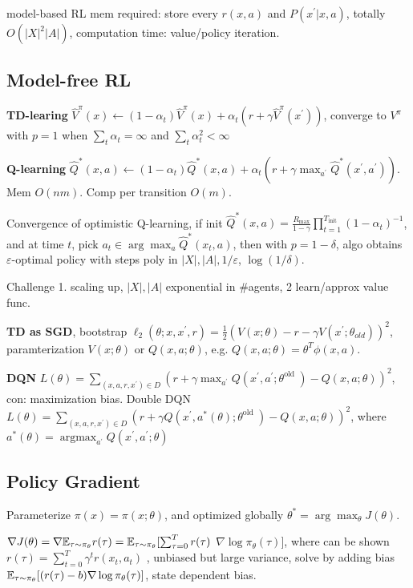 model-based RL mem required: store every $r(x, a)$ and $P(x^{\prime} | x, a)$, totally $O(|X|^2|A|)$, computation time: value/policy iteration.

\subsection{Model-free RL}

\textbf{TD-learing} $\hat{V}^\pi(x) \leftarrow(1-\alpha_t) \hat{V}^\pi(x)+\alpha_t(r+\gamma \hat{V}^\pi(x^{\prime}))$, converge to $V^{\pi}$ with $p=1$ when $\sum_t \alpha_t=\infty$ and $\sum_t \alpha_t^2<\infty$

\textbf{Q-learning} $\hat{Q}^*(x, a) \leftarrow(1-\alpha_t) \hat{Q}^*(x, a)+\alpha_t(r+\gamma \max _{a^{\prime}} \hat{Q}^*(x^{\prime}, a^{\prime}))$. 
Mem $O(nm)$.
Comp per transition $O(m)$.

Convergence of optimistic Q-learning, if init $\hat{Q}^*(x, a)=\frac{R_{\max }}{1-\gamma} \prod_{t=1}^{T_{\text {init }}}(1-\alpha_t)^{-1}$, and at time $t$, pick $a_t \in \arg \max _a \hat{Q}^*(x_t, a)$, then with $p=1-\delta$, algo obtains $\varepsilon$-optimal policy with steps poly in $|X|,|A|, 1 / \varepsilon$, $\log (1 / \delta)$.

Challenge 1. scaling up, $|X|, |A|$ exponential in \#agents, 2 learn/approx value func.

\textbf{TD as SGD}, bootstrap $\ell_2(\theta ; x, x^{\prime}, r)=\frac{1}{2}(V(x ; \theta)-r-\gamma V(x^{\prime} ; \theta_{o l d}))^2$, paramterization $V(x ; \theta)$ or $Q(x, a ; \theta)$, e.g. $Q(x, a ; \theta)=\theta^T \phi(x, a)$.

\textbf{DQN} $L(\theta)=\sum_{(x, a, r, x^{\prime}) \in D}(r+\gamma \max _{a^{\prime}} Q(x^{\prime}, a^{\prime} ; \theta^{\text {old }})-Q(x, a ; \theta))^2$, con: maximization bias.
Double DQN $L(\theta)=\sum_{(x, a, r, x^{\prime}) \in D}(r+\gamma  Q(x^{\prime}, a^{*}(\theta) ; \theta^{\text {old }})-Q(x, a ; \theta))^2$, where $a^*(\theta)={\operatorname{argmax}}_{a^{\prime}} Q(x^{\prime}, a^{\prime} ; \theta)$

\subsection{Policy Gradient}

Parameterize $\pi(x)=\pi(x ; \theta)$, and optimized globally $\theta^*=\arg \max _\theta J(\theta)$.

$\nabla J(\theta)=\nabla \mathbb{E}_{\tau {\small \sim} \pi_\theta} r(\tau)=\mathbb{E}_{\tau {\small \sim} \pi_\theta}[\sum_{\tau=0}^{T} r(\tau)$ $\nabla \log \pi_\theta(\tau)]$, where can be shown $r(\tau)=\sum_{t=0}^T \gamma^t r(x_t, a_t)$ , unbiased but large variance, solve by adding bias $\mathbb{E}_{\tau {\small \sim} \pi_\theta}[(r(\tau)-b) \nabla \log \pi_\theta(\tau)]$, state dependent bias.

